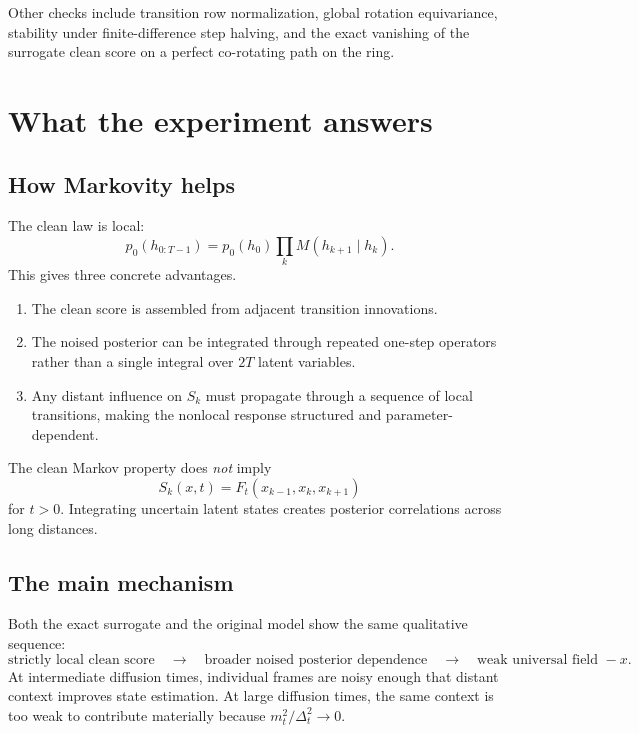 \documentclass[11pt,a4paper]{article}
\begin{document}
Other checks include transition row normalization, global rotation equivariance, stability under finite-difference step halving, and the exact vanishing of the surrogate clean score on a perfect co-rotating path on the ring.

\section{What the experiment answers}

\subsection{How Markovity helps}

The clean law is local:
\[
 p_0(h_{0:T-1})=p_0(h_0)\prod_kM(h_{k+1}\mid h_k).
\]
This gives three concrete advantages.
\begin{enumerate}
\item The clean score is assembled from adjacent transition innovations.
\item The noised posterior can be integrated through repeated one-step operators rather than a single integral over $2T$ latent variables.
\item Any distant influence on $S_k$ must propagate through a sequence of local transitions, making the nonlocal response structured and parameter-dependent.
\end{enumerate}

The clean Markov property does \emph{not} imply
\[
 S_k(x,t)=F_t(x_{k-1},x_k,x_{k+1})
\]
for $t>0$. Integrating uncertain latent states creates posterior correlations across long distances.

\subsection{The main mechanism}

Both the exact surrogate and the original model show the same qualitative sequence:
\begin{equation}
 \text{strictly local clean score}
 \quad\longrightarrow\quad
 \text{broader noised posterior dependence}
 \quad\longrightarrow\quad
 \text{weak universal field }-x.
\end{equation}
At intermediate diffusion times, individual frames are noisy enough that distant context improves state estimation. At large diffusion times, the same context is too weak to contribute materially because $m_t^2/\Delta_t^2\to0$.
\end{document}
